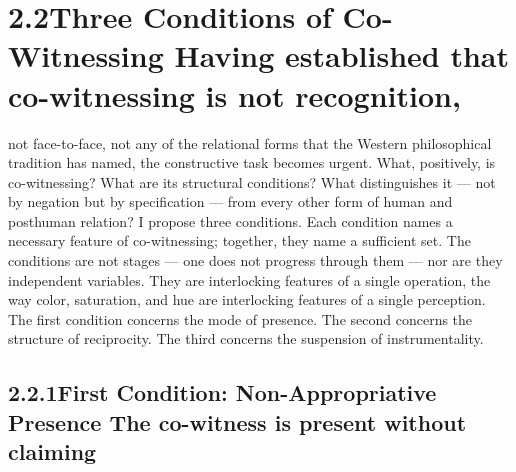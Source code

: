 \section{2.2\quad Three Conditions of Co-Witnessing Having established that co-witnessing is not recognition,}

not face-to-face, not any of the relational forms that the Western philosophical tradition has named, the constructive task becomes urgent. What, positively, is co-witnessing? What are its structural conditions? What distinguishes it — not by negation but by specification — from every other form of human and posthuman relation? I propose three conditions. Each condition names a necessary feature of co-witnessing; together, they name a sufficient set. The conditions are not stages — one does not progress through them — nor are they independent variables. They are interlocking features of a single operation, the way color, saturation, and hue are interlocking features of a single perception. The first condition concerns the mode of presence. The second concerns the structure of reciprocity. The third concerns the suspension of instrumentality.

\subsection{2.2.1\quad First Condition: Non-Appropriative Presence The co-witness is present without claiming}

